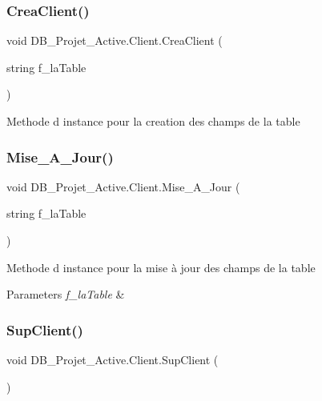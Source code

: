 \subsubsection{\texorpdfstring{CreaClient()}{CreaClient()}}
{\footnotesize\ttfamily void D\+B\+\_\+\+Projet\+\_\+\+Active.\+Client.\+Crea\+Client (\begin{DoxyParamCaption}\item[{string}]{f\+\_\+la\+Table }\end{DoxyParamCaption})}



Methode d instance pour la creation des champs de la table 

\mbox{\label{class_d_b___projet___active_1_1_client_ab6f25727d279e96785521ca70e82b734}} 
\subsubsection{\texorpdfstring{Mise\_A\_Jour()}{Mise\_A\_Jour()}}
{\footnotesize\ttfamily void D\+B\+\_\+\+Projet\+\_\+\+Active.\+Client.\+Mise\+\_\+\+A\+\_\+\+Jour (\begin{DoxyParamCaption}\item[{string}]{f\+\_\+la\+Table }\end{DoxyParamCaption})}



Methode d instance pour la mise à jour des champs de la table 


\begin{DoxyParams}{Parameters}
{\em f\+\_\+la\+Table} & \\
\hline
\end{DoxyParams}
\mbox{\label{class_d_b___projet___active_1_1_client_a8b2d2c340e584eb9fd1f959fe445d7b1}} 
\subsubsection{\texorpdfstring{SupClient()}{SupClient()}}
{\footnotesize\ttfamily void D\+B\+\_\+\+Projet\+\_\+\+Active.\+Client.\+Sup\+Client (\begin{DoxyParamCaption}{ }\end{DoxyParamCaption})}



